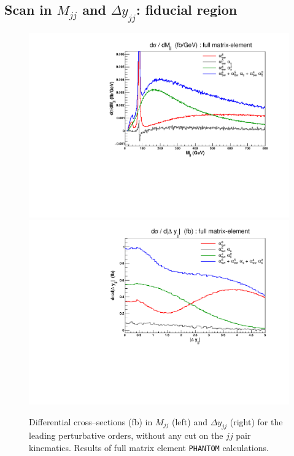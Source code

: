 \subsection{Scan in $M_{jj}$ and $\Delta y_{jj}$: fiducial region}\label{subsec:scan_full}
\begin{figure}[hbt]
\centering
\includegraphics[scale=0.395]{figures/scanfigures/mjj_full.pdf}
\includegraphics[scale=0.395]{figures/scanfigures/dyjj_full.pdf}
\caption{Differential cross--sections (fb) in $M_{jj}$ (left) and $\Delta y_{jj}$ (right) for the leading perturbative orders, without any cut on the $jj$ pair kinematics. Results of full matrix element \texttt{PHANTOM} calculations.} \label{fig:mjjdyjj_1d}
\end{figure}
